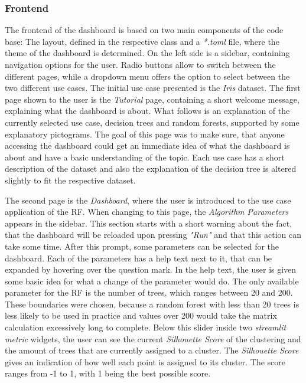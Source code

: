 \documentclass[a4paper, 12pt]{article}
\begin{document}
\subsubsection{Frontend}
The frontend of the dashboard is based on two main components of the code base: The layout, defined
in the respective class and a \textit{*.toml} file, where the theme of the dashboard is determined.
On the left side is a sidebar, containing navigation options for the user. Radio buttons allow to
switch between the different pages, while a dropdown menu offers the option to select between the
two different use cases. The initial use case presented is the \textit{Iris} dataset.
The first page shown to the user is the \textit{Tutorial} page, containing a short welcome message,
explaining what the dashboard is about. What follows is an explanation of the currently selected use
case, decision trees and random forests, supported by some explanatory pictograms.
The goal of this page was to make sure, that anyone accessing the dashboard could get an immediate
idea of what the dashboard is about and have a basic understanding of the topic. Each use case has
a short description of the dataset and also the explanation of the decision tree is altered slightly
to fit the respective dataset.
\par
The second page is the \textit{Dashboard}, where the user is introduced to the use case application
of the RF. When changing to this page, the \textit{Algorithm Parameters} appears in the sidebar. This
section starts with a short warning about the fact, that the dashboard will be reloaded upon pressing
\textit{"Run"} and that this action can take some time.
After this prompt, some parameters can be selected for the dashboard. Each of the parameters has a
help text next to it, that can be expanded by hovering over the question mark. In the help text,
the user is given some basic idea for what a change of the parameter would do.
The only available parameter for
the RF is the number of trees, which ranges between 20 and 200. These boundaries were chosen, because
a random forest with less than 20 trees is less likely to be used in practice and values over 200
would take the matrix calculation excessively long to complete.
Below this slider inside two \textit{streamlit metric} widgets, the user can see the current
\textit{Silhouette Score} \cite{rousseeuw1987silhouettes} of the clustering and the amount of trees that
are currently assigned to a cluster. The \textit{Silhouette Score} gives an indication of how well each
point is assigned to its cluster. The score ranges from -1 to 1, with 1 being the best possible score.
\end{document}
